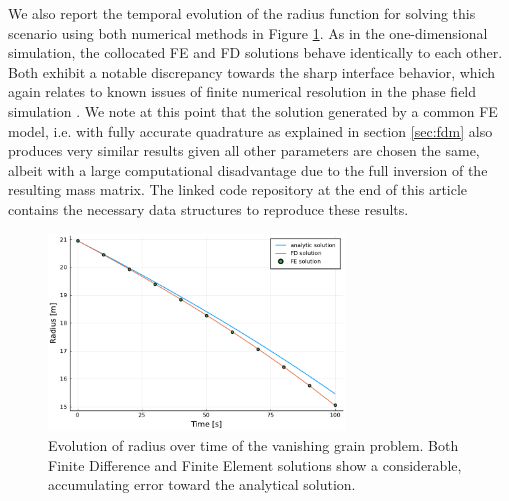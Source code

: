 \documentclass[asi,article,submit,moreauthors]{Definitions/mdpi}
\begin{document}
We also report the temporal evolution of the radius function for solving this scenario using both numerical methods in Figure \ref{fig:ac-radius}.
As in the one-dimensional simulation, the collocated FE and FD solutions behave identically to each other.
Both exhibit a notable discrepancy towards the sharp interface behavior, which again relates to known issues of finite numerical resolution in the phase field simulation \cite{fleckFrictionlessMotionDiffuse2022}.
We note at this point that the solution generated by a common FE model, i.e. with fully accurate quadrature as explained in section \ref{sec:fdm} also produces very similar results given all other parameters are chosen the same, albeit with a large computational disadvantage due to the full inversion of the resulting mass matrix.
The linked code repository at the end of this article contains the necessary data structures to reproduce these results.

\begin{figure}
    \centering
    \includegraphics[width=0.7\textwidth]{Figs/Examples/Allen-Cahn/radius.pdf}
    \caption{Evolution of radius over time of the vanishing grain problem. Both Finite Difference and Finite Element solutions show a considerable, accumulating error toward the analytical solution.}
    \label{fig:ac-radius}
\end{figure}
\end{document}
